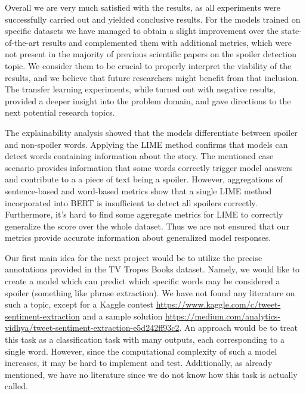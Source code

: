 \documentclass[11pt]{article}
\begin{document}
Overall we are very much satisfied with the results, as all experiments were successfully carried out and yielded conclusive results. For the models trained on specific datasets we have managed to obtain a slight improvement over the state-of-the-art results and complemented them with additional metrics, which were not present in the majority of previous scientific papers on the spoiler detection topic. We consider them to be crucial to properly interpret the viability of the results, and we believe that future researchers might benefit from that inclusion. The transfer learning experiments, while turned out with negative results, provided a deeper insight into the problem domain, and gave directions to the next potential research topics.

The explainability analysis showed that the models differentiate between spoiler and non-spoiler words. Applying the LIME method confirms that models can detect words containing information about the story. The mentioned case scenario provides information that some words correctly trigger model answers and contribute to a a piece of text being a spoiler. However, aggregations of sentence-based and word-based metrics show that a single LIME method incorporated into BERT is insufficient to detect all spoilers correctly. Furthermore, it's hard to find some aggregate metrics for LIME to correctly generalize the score over the whole dataset. Thus we are not ensured that our metrics provide accurate information about generalized model responses.


Our first main idea for the next project would be to utilize the precise annotations provided in the TV Tropes Books dataset. Namely, we would like to create a model which can predict which specific words may be considered a spoiler (something like phrase extraction). We have not found any literature on such a topic, except for a Kaggle contest \url{https://www.kaggle.com/c/tweet-sentiment-extraction} and a sample solution \url{https://medium.com/analytics-vidhya/tweet-sentiment-extraction-e5d242ff93c2}. An approach would be to treat this task as a classification task with many outputs, each corresponding to a single word. However, since the computational complexity of such a model increases, it may be hard to implement and test. Additionally, as already mentioned, we have no literature since we do not know how this task is actually called.
\end{document}
